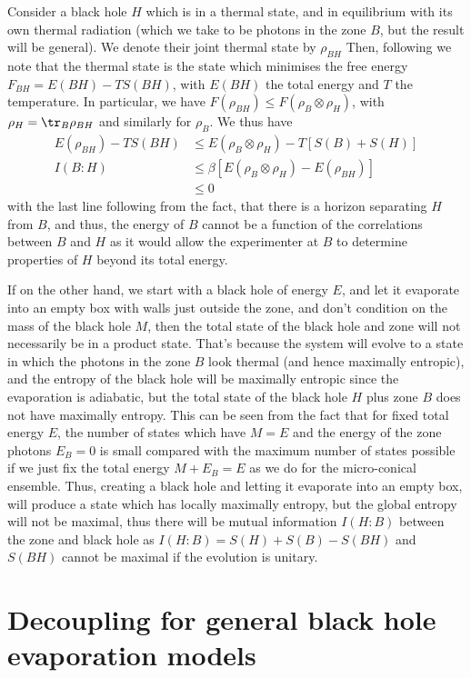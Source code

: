 \documentclass[11pt,a4paper]{article}
\begin{document}
Consider a black hole $H$ which is in a thermal state, and in equilibrium with its own thermal radiation (which we take to be photons in the zone $B$, but the result will be general).
We denote their joint thermal state by $\rho_{BH}$ Then, following \cite{wolf2008area} we note that the thermal state is the state which minimises the free energy $F_{BH}=E(BH)-TS(BH)$, with $E(BH)$ the total energy and $T$ the temperature. In particular, we have $F(\rho_{BH})\leq F(\rho_B\otimes\rho_H)$, with $\rho_H=\tr_B\rho_{BH}$ and similarly for $\rho_B$. We thus have
\begin{align}
E(\rho_{BH})-TS(BH)&\leq E(\rho_B\otimes\rho_H)-T[S(B)+S(H)]\nonumber\\
I(B:H)&\leq\beta [E(\rho_B\otimes\rho_H)-E(\rho_{BH})]\nonumber\\
&\leq 0
\end{align}
with the last line following from the fact, that there is a horizon separating $H$ from $B$, and thus, the energy of $B$ cannot be a function of the correlations between $B$ and $H$ as it would allow the experimenter at $B$ to determine properties of $H$ beyond its total energy.

If on the other hand, we start with a black hole of energy $E$, and let it evaporate into an empty box with walls just outside the zone, and don't condition on the mass of the black hole $M$, then the total state of the black hole and zone will not necessarily be in a product state. That's because the system will evolve to a state in which the photons in the zone $B$ look thermal (and hence maximally entropic), and the entropy of the black hole will be maximally entropic since the evaporation is adiabatic, but the total state of the black hole $H$ plus zone $B$ does not have maximally entropy. This can be seen from the fact that for fixed total energy $E$, the number of states which have $M=E$ and the energy of the zone photons $E_B=0$ is small compared with the maximum number of states possible if we just fix the total energy $M+E_B=E$ as we do for the micro-conical ensemble. Thus, creating a black hole and letting it evaporate into an empty box, will produce a state which has locally maximally entropy, but the global entropy will not be maximal, thus there will be mutual information $I(H:B)$ between the zone and black hole as $I(H:B)=S(H) + S(B)-S(BH)$ and $S(BH)$ cannot be maximal if the evolution is unitary. 

\section{Decoupling for general black hole evaporation models}
\label{sec:general}
\end{document}
